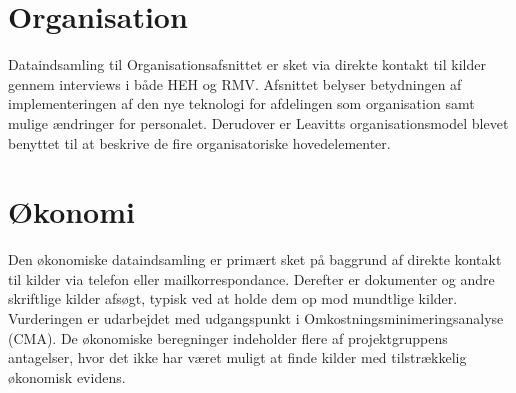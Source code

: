 \section{Organisation}
Dataindsamling til Organisationsafsnittet er sket via direkte kontakt til kilder gennem interviews i både HEH og RMV. Afsnittet belyser betydningen af implementeringen af den nye teknologi for afdelingen som organisation samt mulige ændringer for personalet. Derudover er Leavitts organisationsmodel blevet benyttet til at beskrive de fire organisatoriske hovedelementer.

\section{Økonomi}
Den økonomiske dataindsamling er primært sket på baggrund af direkte kontakt til kilder via telefon eller mailkorrespondance. Derefter er dokumenter og andre skriftlige kilder afsøgt, typisk ved at holde dem op mod mundtlige kilder. Vurderingen er udarbejdet med udgangspunkt i Omkostningsminimeringsanalyse (CMA). De økonomiske beregninger indeholder flere af projektgruppens antagelser, hvor det ikke har været muligt at finde kilder med tilstrækkelig økonomisk evidens. 